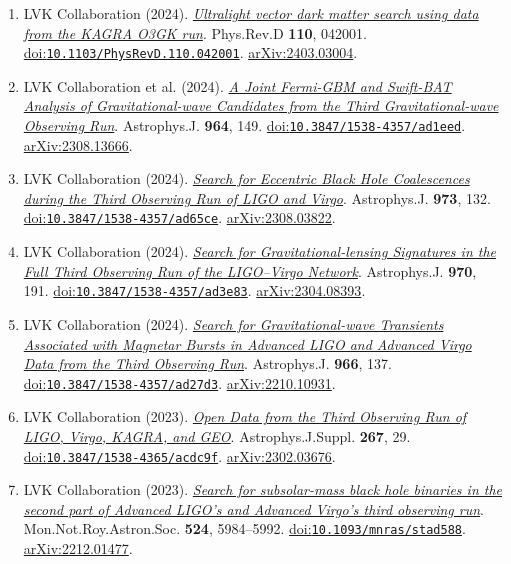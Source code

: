\documentclass[11pt]{article}
\begin{document}
\begin{enumerate}
\item LVK Collaboration (2024). \href{https://arxiv.org/abs/2403.03004}{\textit{Ultralight vector dark matter search using data from the KAGRA O3GK run}}. Phys.Rev.D \textbf{110}, 042001. \href{https://doi.org/10.1103/PhysRevD.110.042001}{doi:\nolinkurl{10.1103/PhysRevD.110.042001}}. \href{https://arxiv.org/abs/2403.03004}{arXiv:2403.03004}.
\item LVK Collaboration et al. (2024). \href{https://arxiv.org/abs/2308.13666}{\textit{A Joint Fermi-GBM and Swift-BAT Analysis of Gravitational-wave Candidates from the Third Gravitational-wave Observing Run}}. Astrophys.J. \textbf{964}, 149. \href{https://doi.org/10.3847/1538-4357/ad1eed}{doi:\nolinkurl{10.3847/1538-4357/ad1eed}}. \href{https://arxiv.org/abs/2308.13666}{arXiv:2308.13666}.
\item LVK Collaboration (2024). \href{https://arxiv.org/abs/2308.03822}{\textit{Search for Eccentric Black Hole Coalescences during the Third Observing Run of LIGO and Virgo}}. Astrophys.J. \textbf{973}, 132. \href{https://doi.org/10.3847/1538-4357/ad65ce}{doi:\nolinkurl{10.3847/1538-4357/ad65ce}}. \href{https://arxiv.org/abs/2308.03822}{arXiv:2308.03822}.
\item LVK Collaboration (2024). \href{https://arxiv.org/abs/2304.08393}{\textit{Search for Gravitational-lensing Signatures in the Full Third Observing Run of the LIGO--Virgo Network}}. Astrophys.J. \textbf{970}, 191. \href{https://doi.org/10.3847/1538-4357/ad3e83}{doi:\nolinkurl{10.3847/1538-4357/ad3e83}}. \href{https://arxiv.org/abs/2304.08393}{arXiv:2304.08393}.
\item LVK Collaboration (2024). \href{https://arxiv.org/abs/2210.10931}{\textit{Search for Gravitational-wave Transients Associated with Magnetar Bursts in Advanced LIGO and Advanced Virgo Data from the Third Observing Run}}. Astrophys.J. \textbf{966}, 137. \href{https://doi.org/10.3847/1538-4357/ad27d3}{doi:\nolinkurl{10.3847/1538-4357/ad27d3}}. \href{https://arxiv.org/abs/2210.10931}{arXiv:2210.10931}.
\item LVK Collaboration (2023). \href{https://arxiv.org/abs/2302.03676}{\textit{Open Data from the Third Observing Run of LIGO, Virgo, KAGRA, and GEO}}. Astrophys.J.Suppl. \textbf{267}, 29. \href{https://doi.org/10.3847/1538-4365/acdc9f}{doi:\nolinkurl{10.3847/1538-4365/acdc9f}}. \href{https://arxiv.org/abs/2302.03676}{arXiv:2302.03676}.
\item LVK Collaboration (2023). \href{https://arxiv.org/abs/2212.01477}{\textit{Search for subsolar-mass black hole binaries in the second part of Advanced LIGO's and Advanced Virgo's third observing run}}. Mon.Not.Roy.Astron.Soc. \textbf{524}, 5984--5992. \href{https://doi.org/10.1093/mnras/stad588}{doi:\nolinkurl{10.1093/mnras/stad588}}. \href{https://arxiv.org/abs/2212.01477}{arXiv:2212.01477}.

\end{enumerate}
\end{document}
